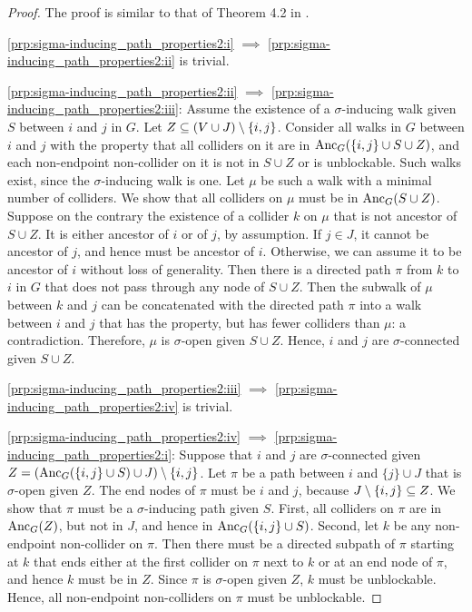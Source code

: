 \begin{proof}
  The proof is similar to that of Theorem 4.2 in \cite{RichardsonSpirtes02}.

  \ref{prp:sigma-inducing_path_properties2:i} $\implies$ \ref{prp:sigma-inducing_path_properties2:ii} is trivial.

  \ref{prp:sigma-inducing_path_properties2:ii} $\implies$ \ref{prp:sigma-inducing_path_properties2:iii}: Assume the existence of a $\sigma$-inducing walk given $S$ between $i$ and $j$ in $G$. 
  Let $Z \subseteq (V \cup J) \setminus\{i,j\}$. 
  Consider all walks in $G$ between $i$ and $j$ with the property that all colliders on it are in $\mathrm{Anc}_{G}({\{i,j\} \cup S \cup Z)}$, and each non-endpoint non-collider on it is not in $S \cup Z$ or is unblockable.
  Such walks exist, since the $\sigma$-inducing walk is one. 
  Let $\mu$ be such a walk with a minimal number of colliders.
  We show that all colliders on $\mu$ must be in $\mathrm{Anc}_{G}(S \cup Z)$. 
  Suppose on the contrary the existence of a collider $k$ on $\mu$ that is not ancestor of $S \cup Z$.
  It is either ancestor of $i$ or of $j$, by assumption.
  If $j \in J$, it cannot be ancestor of $j$, and hence must be ancestor of $i$.
  Otherwise, we can assume it to be ancestor of $i$ without loss of generality.
  Then there is a directed path $\pi$ from $k$ to $i$ in $G$ that does not pass through any node of $S \cup Z$.
  Then the subwalk of $\mu$ between $k$ and $j$ can be concatenated with the directed path $\pi$
  into a walk between $i$ and $j$ that has the property, but has fewer colliders than $\mu$: a contradiction. 
  Therefore, $\mu$ is $\sigma$-open given $S \cup Z$.
  Hence, $i$ and $j$ are $\sigma$-connected given $S \cup Z$.

  \ref{prp:sigma-inducing_path_properties2:iii} $\implies$ \ref{prp:sigma-inducing_path_properties2:iv} is trivial.

  \ref{prp:sigma-inducing_path_properties2:iv} $\implies$ \ref{prp:sigma-inducing_path_properties2:i}:
  Suppose that %
  $i$ and $j$ are $\sigma$-connected given $Z = (\mathrm{Anc}_{G}(\{i,j\} \cup S) \cup J) \setminus \{i,j\}$. 
  Let $\pi$ be a path between $i$ and $\{j\} \cup J$ that is $\sigma$-open given $Z$. %
  The end nodes of $\pi$ must be $i$ and $j$, because $J \setminus \{i,j\} \subseteq Z$.
  We show that $\pi$ must be a $\sigma$-inducing path given $S$. 
  First, all colliders on $\pi$ are in $\mathrm{Anc}_G(Z)$, but not in $J$, and hence in $\mathrm{Anc}_{G}(\{i,j\} \cup S)$.
  Second, let $k$ be any non-endpoint non-collider on $\pi$.
  Then there must be a directed subpath of $\pi$ starting at $k$ that ends either at the first collider on $\pi$ next to $k$ or at an end node of $\pi$, and hence $k$ must be in $Z$. 
  Since $\pi$ is $\sigma$-open given $Z$, $k$ must be unblockable.
  Hence, all non-endpoint non-colliders on $\pi$ must be unblockable.
\end{proof}
